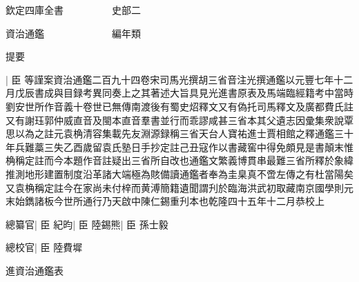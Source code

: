 






























































欽定四庫全書　　　　　史部二

資治通鑑　　　　　　　編年類

提要

|{
	臣}
等謹案資治通鑑二百九十四卷宋司馬光撰胡三省音注光撰通鑑以元豐七年十二月戊辰書成與目録考異同奏上之其著述大旨具見光進書原表及馬端臨經籍考中當時劉安世所作音義十卷世已無傳南渡後有蜀史炤釋文又有偽托司馬釋文及廣都費氏註又有謝珏郭仲威直音及閩本直音羣書並行而乖謬咸甚三省本其父遺志因彚集衆說覃思以為之註元袁桷清容集載先友淵源録稱三省天台人寶祐進士賈相館之釋通鑑三十年兵難藁三失乙酉歲留袁氏塾日手抄定註己丑寇作以書藏窖中得免頗見是書顛末惟桷稱定註而今本題作音註疑出三省所自改也通鑑文繁義博貫串最難三省所釋於象緯推測地形建置制度沿革諸大端極為賅備讀通鑑者奉為圭臬真不啻左傳之有杜當陽矣又袁桷稱定註今在家尚未付梓而黄溥簡籍遺聞謂刋於臨海洪武初取藏南京國學則元末始鐫諸板今世所通行乃天啟中陳仁錫重刋本也乾隆四十五年十二月恭校上

總纂官|{
	臣}
紀昀|{
	臣}
陸錫熊|{
	臣}
孫士毅

總校官|{
	臣}
陸費墀

進資治通鑑表

